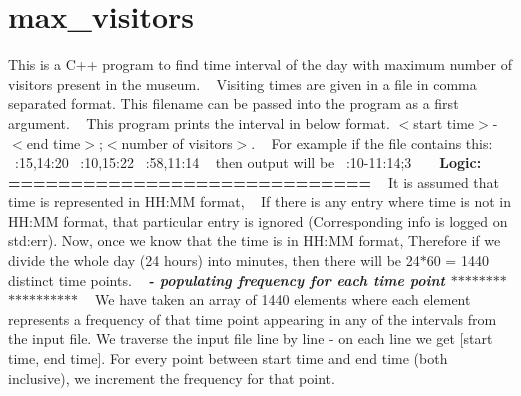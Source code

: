 \chapter{max\+\_\+visitors}
\hypertarget{index}{}\label{index}
\label{index_md__finding_01the_01time_01period}%
%
 This is a C++ program to find time interval of the day with maximum number of visitors present in the museum. ~\newline
Visiting times are given in a file in comma separated format. This filename can be passed into the program as a first argument. ~\newline
This program prints the interval in below format. $<$start time$>$-\/$<$end time$>$;$<$number of visitors$>$. ~\newline
For example if the file contains this\+: ~\+:15,14\+:20 ~\+:10,15\+:22 ~\+:58,11\+:14 ~\newline
then output will be ~\+:10-\/11\+:14;3 ~\newline
~\newline
{\bfseries{Logic\+: ============================= }}~\newline
It is assumed that time is represented in HH\+:MM format, ~\newline
If there is any entry where time is not in HH\+:MM format, that particular entry is ignored (Corresponding info is logged on std\+:err). Now, once we know that the time is in HH\+:MM format, Therefore if we divide the whole day (24 hours) into minutes, then there will be 24\texorpdfstring{$\ast$}{*}60 = 1440 distinct time points. ~\newline
 {\bfseries{{\itshape  -\/ populating frequency for each time point \texorpdfstring{$\ast$}{*}\texorpdfstring{$\ast$}{*}\texorpdfstring{$\ast$}{*}\texorpdfstring{$\ast$}{*}\texorpdfstring{$\ast$}{*}\texorpdfstring{$\ast$}{*}\texorpdfstring{$\ast$}{*}\texorpdfstring{$\ast$}{*}\texorpdfstring{$\ast$}{*}\texorpdfstring{$\ast$}{*}\texorpdfstring{$\ast$}{*}\texorpdfstring{$\ast$}{*}\texorpdfstring{$\ast$}{*}\texorpdfstring{$\ast$}{*}\texorpdfstring{$\ast$}{*}\texorpdfstring{$\ast$}{*}\texorpdfstring{$\ast$}{*}\texorpdfstring{$\ast$}{*} }}} ~\newline
We have taken an array of 1440 elements where each element represents a frequency of that time point appearing in any of the intervals from the input file. We traverse the input file line by line -\/ on each line we get \mbox{[}start time, end time\mbox{]}. For every point between start time and end time (both inclusive), we increment the frequency for that point.~\newline
